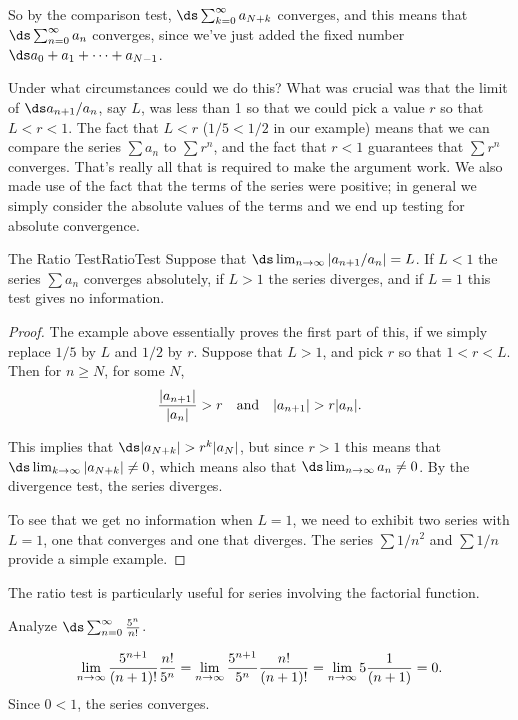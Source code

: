 So by the comparison test, $\ds\sum_{k=0}^\infty a_{N+k}$ converges,
and this means that $\ds\sum_{n=0}^\infty a_{n}$ converges, since
we've just added the fixed number $\ds a_0+a_1+\cdots+a_{N-1}$.

Under what circumstances could we do this? What was crucial was that
the limit of $\ds a_{n+1}/a_n$, say $L$, was less than 1 so that we could pick a
value $r$ so that $L<r<1$. The fact that $L<r$ ($1/5<1/2$ in our
example) means that we can compare the series $\sum a_n$ to $\sum
r^n$, and the fact that $r<1$ guarantees that $\sum r^n$
converges. That's really all that is required to make the argument
work. We also made use of the fact that the terms of the series were
positive; in general we simply consider the absolute values of the
terms and we end up testing for absolute convergence.

\begin{theorem}{The Ratio Test}{RatioTest}
Suppose that $\ds\lim_{n\to \infty} |a_{n+1}/a_n|=L$. If $L<1$
the series $\sum a_n$ converges absolutely, 
if $L>1$ the series diverges, and if
$L=1$ this test gives no information.
\end{theorem}
\begin{proof}
The example above essentially proves the first part of this, if we
simply replace $1/5$ by $L$ and $1/2$ by $r$. 
Suppose that $L>1$, and pick $r$ so that $1<r<L$.
Then for $n\ge N$, for some $N$,
\[{|a_{n+1}|\over |a_n|} > r \quad \hbox{and}\quad |a_{n+1}| > r|a_n|.\]

This implies that $\ds |a_{N+k}|>r^k|a_N|$, but since $r>1$ this means
that $\ds\lim_{k\to\infty}|a_{N+k}|\not=0$, which means also that
$\ds\lim_{n\to\infty}a_n\not=0$. By the divergence test, the series
diverges. 

To see that we get no information when $L=1$, we need to exhibit two
series with $L=1$, one that converges and one that diverges. The series
$\sum 1/n^2$ and $\sum 1/n$ provide a simple example.
\end{proof}

The ratio test is particularly useful for series involving
the factorial function.

\begin{example}{}{}
Analyze $\ds\sum_{n=0}^\infty  \frac{5^n}{n!}$.
\end{example}
\begin{solution}
$$
  \lim_{n\to\infty} {5^{n+1}\over (n+1)!}{n!\over 5^n}=
  \lim_{n\to\infty} {5^{n+1}\over 5^n}{n!\over (n+1)!}=
  \lim_{n\to\infty} {5}{1\over (n+1)}=0.
$$
Since $0<1$, the series converges.
\end{solution}


